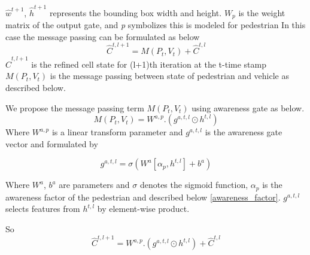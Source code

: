 $\hat{w}^{t+1}$, $\hat{h}^{t+1}$ represents the bounding box width and height.
$W_p$ is the weight matrix of the output gate, and \textit{p} symbolizes this is modeled for pedestrian
%
In this case the message passing can be formulated as below 
\begin{equation}
\hat{C}^{t, l+1}=M(P_t, V_t) +  \hat{C}^{t, l}
\end{equation}
$\hat{C}^{t, l+1}$ is the refined cell state for (l+1)th iteration at the t-time stamp \\
$M(P_t, V_t)$ is the message passing between state of pedestrian and vehicle as described below.

We propose the message passing term $M(P_t, V_t)$ using awareness gate as below.
\begin{equation}
M(P_t, V_t) = W^{a,p}.(g^{a,t,l} \odot {h}^{t, l} ) 
\end{equation}
Where $W^{a,p}$ is a linear transform parameter and $g^{a,t,l}$ is the awareness gate vector and formulated by

\begin{equation}
g^{a,t,l} = \sigma(W^{a} [ \alpha_p, {h}^{t, l} ] + b^{a} ) 
\end{equation}

Where $W^{a}$, $b^{a}$ are parameters and $\sigma$ denotes the sigmoid function, $\alpha_p$ is the awareness factor of the pedestrian and described below \ref{awareness_factor}.
$g^{a,t,l}$ selects features from ${h}^{t, l}$ by element-wise product.

So 
\begin{equation}
\hat{C}^{t, l+1}= W^{a,p}.(g^{a,t,l} \odot {h}^{t, l} )+  \hat{C}^{t, l}
\end{equation}



